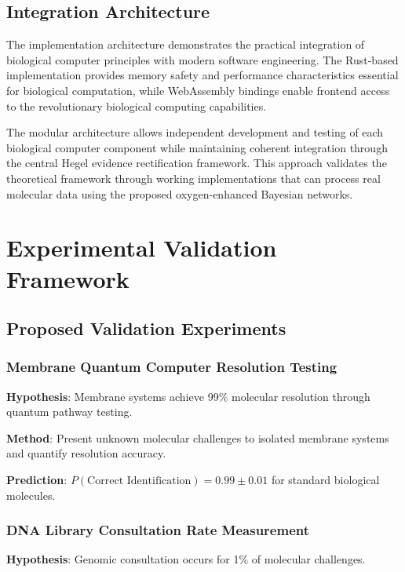 \documentclass[12pt,a4paper]{article}
\begin{document}
\subsection{Integration Architecture}

The implementation architecture demonstrates the practical integration of biological computer principles with modern software engineering. The Rust-based implementation provides memory safety and performance characteristics essential for biological computation, while WebAssembly bindings enable frontend access to the revolutionary biological computing capabilities.

The modular architecture allows independent development and testing of each biological computer component while maintaining coherent integration through the central Hegel evidence rectification framework. This approach validates the theoretical framework through working implementations that can process real molecular data using the proposed oxygen-enhanced Bayesian networks.

\section{Experimental Validation Framework}

\subsection{Proposed Validation Experiments}

\subsubsection{Membrane Quantum Computer Resolution Testing}

\textbf{Hypothesis}: Membrane systems achieve 99\% molecular resolution through quantum pathway testing.

\textbf{Method}: Present unknown molecular challenges to isolated membrane systems and quantify resolution accuracy.

\textbf{Prediction}: $P(\text{Correct Identification}) = 0.99 \pm 0.01$ for standard biological molecules.

\subsubsection{DNA Library Consultation Rate Measurement}

\textbf{Hypothesis}: Genomic consultation occurs for 1\% of molecular challenges.
\end{document}
